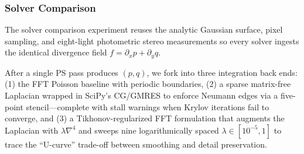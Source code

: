 \documentclass[11pt]{article}
\begin{document}
\subsubsection{Solver Comparison}



  The solver comparison experiment reuses the analytic Gaussian surface, pixel sampling, and eight-light photometric stereo 
  measurements so every solver ingests the identical divergence field $f = \partial_xp + \partial_y q$. 
  
  After a single PS pass produces $(p,q)$, we fork into three integration back ends:
  (1) the FFT Poisson baseline with periodic boundaries, (2) a sparse matrix-free Laplacian wrapped in SciPy's CG/GMRES 
  to enforce Neumann edges via a five-point stencil—complete with stall warnings when
  Krylov iterations fail to converge, and (3) a Tikhonov-regularized FFT formulation that augments the Laplacian with
   $\lambda \nabla^4$ and sweeps nine logarithmically
  spaced $\lambda \in [10^{-5}, 1]$ to trace the “U-curve” trade-off between smoothing and detail preservation. 
  
  \begin{center}
  \end{center}
  
\end{document}
